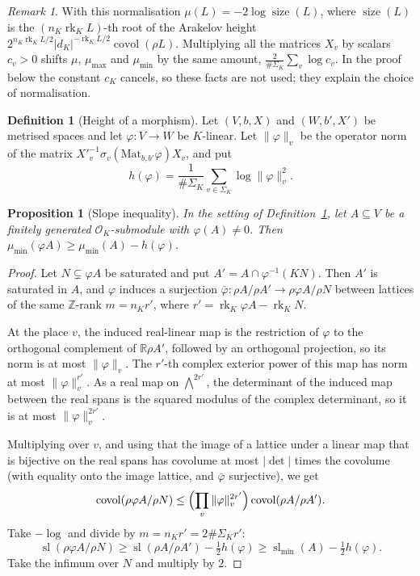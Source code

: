 \documentclass[10pt]{amsart}
\newtheorem{proposition}[theorem]{Proposition}
\theoremstyle{definition}
\newtheorem{definition}[theorem]{Definition}
\theoremstyle{remark}
\newtheorem{remark}[theorem]{Remark}
\newcommand{\R}{\mathbb R}
\newcommand{\Z}{\mathbb Z}
\begin{document}
\begin{remark}\label{rem:normalisation}
With this normalisation $\mu(L)=-2\log\operatorname{size}(L)$, where $\operatorname{size}(L)$ is the $(n_K\operatorname{rk}_KL)$-th root of the Arakelov height $2^{n_K\operatorname{rk}_KL/2}|d_K|^{-\operatorname{rk}_KL/2}\operatorname{covol}(\rho L)$. Multiplying all the matrices $X_v$ by scalars $c_v>0$ shifts $\mu$, $\mu_{\max}$ and $\mu_{\min}$ by the same amount, $\frac{2}{\#\Sigma_K}\sum_v\log c_v$. In the proof below the constant $c_K$ cancels, so these facts are not used; they explain the choice of normalisation.
\end{remark}

\begin{definition}[Height of a morphism]\label{def:htmap}
Let $(V,b,X)$ and $(W,b',X')$ be metrised spaces and let $\varphi\colon V\to W$ be $K$-linear. Let $\|\varphi\|_v$ be the operator norm of the matrix $X'^{-1}_v\sigma_v(\mathrm{Mat}_{b,b'}\varphi)X_v$, and put
\[
h(\varphi)=\frac{1}{\#\Sigma_K}\sum_{v\in\Sigma_K}\log\|\varphi\|_v^2 .
\]
\end{definition}

\begin{proposition}[Slope inequality]\label{prop:slopeineq}
In the setting of Definition~\ref{def:htmap}, let $A\subseteq V$ be a finitely generated $\mathcal O_K$-submodule with $\varphi(A)\ne0$. Then $\mu_{\min}(\varphi A)\ge\mu_{\min}(A)-h(\varphi)$.
\end{proposition}
\begin{proof}
Let $N\subsetneq\varphi A$ be saturated and put $A'=A\cap\varphi^{-1}(KN)$. Then $A'$ is saturated in $A$, and $\varphi$ induces a surjection $\bar\varphi\colon\rho A/\rho A'\to\rho\varphi A/\rho N$ between lattices of the same $\Z$-rank $m=n_Kr'$, where $r'=\operatorname{rk}_K\varphi A-\operatorname{rk}_KN$.

At the place $v$, the induced real-linear map is the restriction of $\varphi$ to the orthogonal complement of $\R\rho A'$, followed by an orthogonal projection, so its norm is at most $\|\varphi\|_v$. The $r'$-th complex exterior power of this map has norm at most $\|\varphi\|_v^{r'}$. As a real map on $\bigwedge^{2r'}$, the determinant of the induced map between the real spans is the squared modulus of the complex determinant, so it is at most $\|\varphi\|_v^{2r'}$.

Multiplying over $v$, and using that the image of a lattice under a linear map that is bijective on the real spans has covolume at most $|\det|$ times the covolume (with equality onto the image lattice, and $\bar\varphi$ surjective), we get
\[
\operatorname{covol}(\rho\varphi A/\rho N)\le\Bigl(\prod_v\|\varphi\|_v^{2r'}\Bigr)\operatorname{covol}(\rho A/\rho A').
\]
Take $-\log$ and divide by $m=n_Kr'=2\#\Sigma_Kr'$:
\[
\operatorname{sl}(\rho\varphi A/\rho N)\ge\operatorname{sl}(\rho A/\rho A')-\tfrac12h(\varphi)\ge\operatorname{sl}_{\min}(A)-\tfrac12h(\varphi).
\]
Take the infimum over $N$ and multiply by $2$.
\end{proof}
\end{document}
